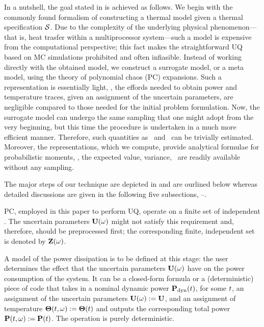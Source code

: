 
In a nutshell, the goal stated in  is achieved as follows. We begin with the commonly found formalism of constructing a thermal model given a thermal specification $\mathcal{S}$. Due to the complexity of the underlying physical phenomenon---that is, heat trasfer within a multiprocessor system---such a model is expensive from the computational perspective; this fact makes the straightforward UQ based on MC simulations prohibited and often infiasible. Instead of working directly with the obtained model, we construct a surrogate model, or a meta model, using the theory of polynomial chaos (PC) expansions. Such a representation is essentially light, \ie, the effords needed to obtain power and temperature traces, given an assignment of the uncertain parameters, are negligible compared to those needed for the initial problem formulation. Now, the surrogate model can undergo the same sampling that one might adopt from the very beginning, but this time the procedure is undertaken in a much more efficient manner. Therefore, such quantities as \cdfs\ and \pdfs\ can be trivially estimated. Moreover, the representations, which we compute, provide analytical formulae for probabilistic moments, \ie, the expected value, variance, \etc\ are readily available without any sampling.

The major steps of our technique are depicted in  and are ourlined below whereas detailed discussions are given in the following five subsections, --.

 PC, employed in this paper to perform UQ, operate on a finite set of independent \rvs. The uncertain parameters $\mathbf{U}(\omega)$ might not satisfy this requirement and, therefore, should be preprocessed first; the corresponding finite, independent set is denoted by $\mathbf{Z}(\omega)$.

 A model of the power dissipation is to be defined at this stage: the user determines the effect that the uncertain parameters $\mathbf{U}(\omega)$ have on the power consumption of the system. It can be a closed-form formula or a (deterministic) piece of code that takes in a nominal dynamic power $\mathbf{P}_{\text{dyn}}(t)$, for some $t$, an assignment of the uncertain parameters $\mathbf{U}(\omega) := \mathbf{U}$, and an assignment of temperature ${\boldsymbol\Theta}(t, \omega) := {\boldsymbol\Theta}(t)$ and outputs the corresponding total power $\mathbf{P}(t, \omega) := \mathbf{P}(t)$. The operation is purely deterministic.

